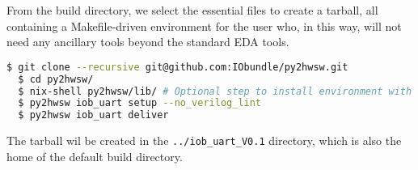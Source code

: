 %

From the build directory, we select the essential files to create a tarball, all
containing a Makefile-driven environment for the user who, in this way, will not
need any ancillary tools beyond the standard EDA tools.

\begin{lstlisting}[language=bash]
  $ git clone --recursive git@github.com:IObundle/py2hwsw.git
  $ cd py2hwsw/
  $ nix-shell py2hwsw/lib/ # Optional step to install environment with necessary dependencies
  $ py2hwsw iob_uart setup --no_verilog_lint
  $ py2hwsw iob_uart deliver
\end{lstlisting}

The tarball wil be created in the \texttt{../iob\_uart\_V0.1} directory, which is
also the home of the default build directory.
